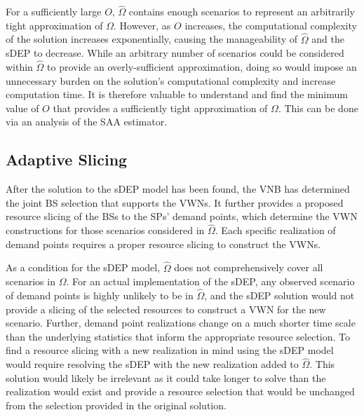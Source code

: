 \documentclass[12pt,dvipsnames]{report}
\begin{document}
%
For a sufficiently large $O$, $\hat{\Omega}$ contains enough scenarios to represent an arbitrarily tight approximation of $\Omega$.  However, as $O$ increases, the computational complexity of the solution increases exponentially, causing the manageability of $\hat{\Omega}$ and the sDEP to decrease.  While an arbitrary number of scenarios could be considered within $\hat{\Omega}$ to provide an overly-sufficient approximation, doing so would impose an unnecessary burden on the solution's computational complexity and increase computation time.  It is therefore valuable to understand and find the minimum value of $O$ that provides a sufficiently tight approximation of $\Omega$.  This can be done via an analysis of the SAA estimator.


\subsection{Adaptive Slicing} \label{subsec:dep_slicing}

After the solution to the sDEP model has been found, the VNB has determined the joint BS selection that supports the VWNs.  It further provides a proposed resource slicing of the BSs to the SPs' demand points, which determine the VWN constructions for those scenarios considered in $\hat{\Omega}$.  Each specific realization of demand points requires a proper resource slicing to construct the VWNs.

As a condition for the sDEP model, $\hat{\Omega}$ does not comprehensively cover all scenarios in $\Omega$.  For an actual implementation of the sDEP, any observed scenario of demand points is highly unlikely to be in $\hat{\Omega}$, and the sDEP solution would not provide a slicing of the selected resources to construct a VWN for the new scenario.  Further, demand point realizations change on a much shorter time scale than the underlying statistics that inform the appropriate resource selection.  To find a resource slicing with a new realization in mind using the sDEP model would require resolving the sDEP with the new realization added to $\hat{\Omega}$.  This solution would likely be irrelevant as it could take longer to solve than the realization would exist and provide a resource selection that would be unchanged from the selection provided in the original solution.
\end{document}
